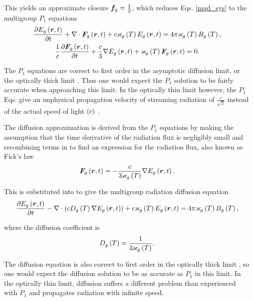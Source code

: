 	This yields an approximate closure $\bm{f}_g = \frac{1}{3}$, which reduces Eqs. \eqref{mqd_sys} to the multigroup $P_1$ equations
	\begin{subequations}
		\begin{gather}
		\frac{\partial E_g\left(\bm{r},t\right)}{\partial t} + \nabla\cdot\bm{F}_g\left(\bm{r},t\right) + c\varkappa_{g}\left( T\right)E_g\left(\bm{r},t\right) = 4\pi\varkappa_{g}\left( T\right)B_{g}\left( T\right), \label{p1_zero}\\
		\frac{1}{c}\frac{\partial \bm{F}_g\left(\bm{r},t\right)}{\partial t} + \frac{c}{3}\nabla E_g\left(\bm{r},t\right) + \varkappa_{g}\left( T\right)\bm{F}_g\left(\bm{r},t\right) = 0. \label{p1_first}
		\end{gather}
		\label{p1_sys}
	\end{subequations}
	
	The $P_1$ equations are correct to first order in the asymptotic diffusion limit, or the optically thick limit \cite{Morel-2000}. Thus one would expect the $P_1$ solution to be fairly accurate when approaching this limit. In the optically thin limit however, the $P_1$ Eqs. give an unphysical propagation velocity of streaming radiation of $\frac{c}{\sqrt{3}}$ instead of the actual speed of light $\left( c\right)$ \cite{olson-auer-hall-2000}.
	
	\ind The diffusion approximation is derived from the $P_1$ equations by making the assumption that the time derivative of the radiation flux is negligibly small and recombining terms in  to find an expression for the radiation flux, also known as Fick's law
	\begin{equation}
		\bm{F}_g\left(\bm{r},t\right) = -\frac{c}{3\varkappa_{g}\left( T\right)}\nabla E_g\left(\bm{r},t\right).
	\end{equation}
	
	This is substituted into  to give the multigroup radiation diffusion equation
	\begin{equation}
		\frac{\partial E_g\left(\bm{r},t\right)}{\partial t} - \nabla\cdot\left( cD_g\left( T\right)\nabla E_g\left(\bm{r},t\right)\right) + c\varkappa_{g}\left( T\right)E_g\left(\bm{r},t\right) = 4\pi\varkappa_{g}\left( T\right)B_{g}\left( T\right),
	\end{equation}
	
	where the diffusion coefficient is
	\begin{equation}
		D_g\left( T\right) = \frac{1}{3\varkappa_{g}\left( T\right)}.
	\end{equation}
	
	The diffusion equation is also correct to first order in the optically thick limit \cite{Morel-2000}, so one would expect the diffusion solution to be as accurate as $P_1$ in this limit. In the optically thin limit, diffusion suffers a different problem than experienced with $P_1$ and propagates radiation with infinite speed.
	
